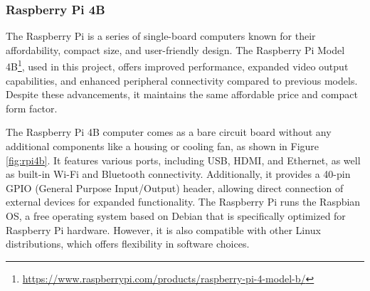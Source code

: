 


\subsubsection{Raspberry Pi 4B}
\label{subsec:rpi}

The Raspberry Pi is a series of single-board computers known for their affordability, compact size, and user-friendly design. The Raspberry Pi Model 4B\footnote{\url{https://www.raspberrypi.com/products/raspberry-pi-4-model-b/}}, used in this project, offers improved performance, expanded video output capabilities, and enhanced peripheral connectivity compared to previous models. Despite these advancements, it maintains the same affordable price and compact form factor.

The Raspberry Pi 4B computer comes as a bare circuit board without any additional components like a housing or cooling fan, as shown in Figure \ref{fig:rpi4b}. It features various ports, including USB, HDMI, and Ethernet, as well as built-in Wi-Fi and Bluetooth connectivity. Additionally, it provides a 40-pin GPIO (General Purpose Input/Output) header, allowing direct connection of external devices for expanded functionality.
The Raspberry Pi runs the Raspbian OS, a free operating system based on Debian that is specifically optimized for Raspberry Pi hardware. However, it is also compatible with other Linux distributions, which offers flexibility in software choices.

